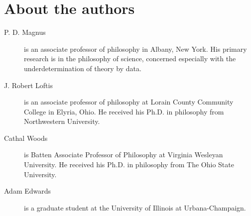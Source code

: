 \thispagestyle{empty}

\section*{About the authors}
\begin{fullwidth}
\begin{description}
\item[P. D. Magnus] is an associate professor of philosophy in Albany, New York. His primary research is in the philosophy of science, concerned especially with the underdetermination of theory by data.
\item[J. Robert Loftis] is an associate professor of philosophy at Lorain County Community College in Elyria, Ohio. He received his Ph.D. in philosophy from Northwestern University.
\item[Cathal Woods] is Batten Associate Professor of Philosophy at Virginia Wesleyan University. He received his Ph.D. in philosophy from The Ohio State University.
\item[Adam Edwards] is a graduate student at the University of Illinois at Urbana-Champaign.
\end{description}
\end{fullwidth}
\vfill
